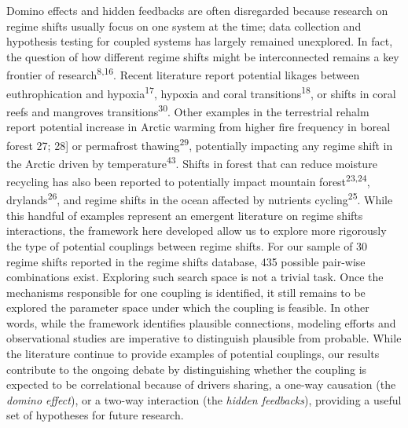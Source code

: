 \documentclass[9pt,]{article}
\begin{document}
Domino effects and hidden feedbacks are often disregarded because
research on regime shifts usually focus on one system at the time; data
collection and hypothesis testing for coupled systems has largely
remained unexplored. In fact, the question of how different regime
shifts might be interconnected remains a key frontier of
research\textsuperscript{8,16}. Recent literature report potential
likages between euthrophication and hypoxia\textsuperscript{17}, hypoxia
and coral transitions\textsuperscript{18}, or shifts in coral reefs and
mangroves transitions\textsuperscript{30}. Other examples in the
terrestrial rehalm report potential increase in Arctic warming from
higher fire frequency in boreal forest 27; 28{]} or permafrost
thawing\textsuperscript{29}, potentially impacting any regime shift in
the Arctic driven by temperature\textsuperscript{43}. Shifts in forest
that can reduce moisture recycling has also been reported to potentially
impact mountain forest\textsuperscript{23,24},
drylands\textsuperscript{26}, and regime shifts in the ocean affected by
nutrients cycling\textsuperscript{25}. While this handful of examples
represent an emergent literature on regime shifts interactions, the
framework here developed allow us to explore more rigorously the type of
potential couplings between regime shifts. For our sample of 30 regime
shifts reported in the regime shifts database, 435 possible pair-wise
combinations exist. Exploring such search space is not a trivial task.
Once the mechanisms responsible for one coupling is identified, it still
remains to be explored the parameter space under which the coupling is
feasible. In other words, while the framework identifies plausible
connections, modeling efforts and observational studies are imperative
to distinguish plausible from probable. While the literature continue to
provide examples of potential couplings, our results contribute to the
ongoing debate by distinguishing whether the coupling is expected to be
correlational because of drivers sharing, a one-way causation (the
\emph{domino effect}), or a two-way interaction (the \emph{hidden
feedbacks}), providing a useful set of hypotheses for future research.
\end{document}
